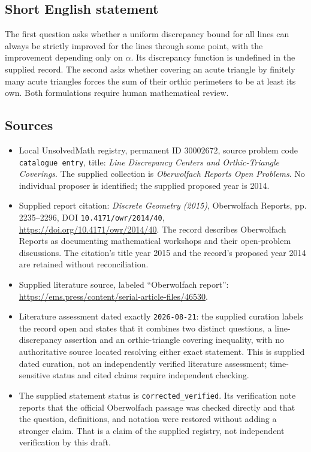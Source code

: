 \documentclass[11pt]{article}
\begin{document}
\subsection{Short English statement}
The first question asks whether a uniform discrepancy bound for all lines can always be strictly improved for the lines through some point, with the improvement depending only on \(\alpha\). Its discrepancy function is undefined in the supplied record. The second asks whether covering an acute triangle by finitely many acute triangles forces the sum of their orthic perimeters to be at least its own. Both formulations require human mathematical review.
\subsection{Sources}
\begin{itemize}
\item Local UnsolvedMath registry, permanent ID \(30002672\), source problem code \texttt{catalogue entry}, title: \emph{Line Discrepancy Centers and Orthic-Triangle Coverings}. The supplied collection is \emph{Oberwolfach Reports Open Problems}. No individual proposer is identified; the supplied proposed year is 2014.
\item Supplied report citation: \emph{Discrete Geometry (2015)}, Oberwolfach Reports, pp. 2235--2296, DOI \texttt{10.4171/owr/2014/40}, \url{https://doi.org/10.4171/owr/2014/40}. The record describes Oberwolfach Reports as documenting mathematical workshops and their open-problem discussions. The citation's title year 2015 and the record's proposed year 2014 are retained without reconciliation.
\item Supplied literature source, labeled ``Oberwolfach report'': \url{https://ems.press/content/serial-article-files/46530}.
\item Literature assessment dated exactly \texttt{2026-08-21}: the supplied curation labels the record open and states that it combines two distinct questions, a line-discrepancy assertion and an orthic-triangle covering inequality, with no authoritative source located resolving either exact statement. This is supplied dated curation, not an independently verified literature assessment; time-sensitive status and cited claims require independent checking.
\item The supplied statement status is \texttt{corrected\_verified}. Its verification note reports that the official Oberwolfach passage was checked directly and that the question, definitions, and notation were restored without adding a stronger claim. That is a claim of the supplied registry, not independent verification by this draft.
\end{itemize}
\end{document}
